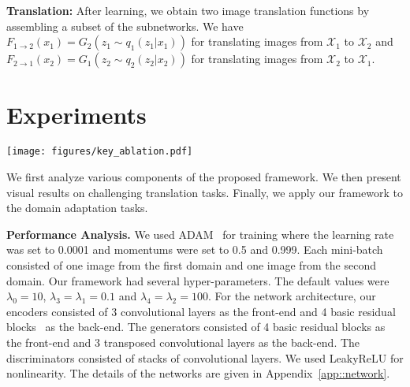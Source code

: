 \documentclass{article}
\begin{document}
{\bf Translation:} After learning, we obtain two image translation functions by assembling a subset of the subnetworks. We have $F_{1\rightarrow 2} (x_1)=G_2 (z_1 \sim q_1 (z_1|x_1))$ for translating images from $\mathcal{X}_1$ to $\mathcal{X}_2$ and  $F_{2\rightarrow 1} (x_2)=G_1 (z_2 \sim q_2 (z_2|x_2))$ for translating images from $\mathcal{X}_2$ to $\mathcal{X}_1$.


 \section{Experiments}

\begin{figure*}[t]
\centering
\texttt{[image: figures/key\_ablation.pdf]}
\caption{\small (a) Illustration of the Map dataset. Left: satellite image. Right: map. We translate holdout satellite images to maps and measure the accuracy achieved by various configurations of the proposed framework. (b) Translation accuracy versus different network architectures. (c) Translation accuracy versus different hyper-parameter values. (d) Impact of weight-sharing and cycle-consistency constraints on translation accuracy.}
\label{fig::map}
\vspace{-4 mm}
\end{figure*}

We first analyze various components of the proposed framework. We then present visual results on challenging translation tasks. Finally, we apply our framework to the domain adaptation tasks.

{\bf Performance Analysis.} We used ADAM~\cite{kingma2014adam} for training where the learning rate was set to 0.0001 and momentums were set to 0.5 and 0.999. Each mini-batch consisted of one image from the first domain and one image from the second domain. Our framework had several hyper-parameters. The default values were $\lambda_0=10$, $\lambda_3=\lambda_1=0.1$ and $\lambda_4=\lambda_2=100$. For the network architecture, our encoders consisted of 3 convolutional layers as the front-end and 4 basic residual blocks~\cite{he2016deep} as the back-end. The generators consisted of 4 basic residual blocks as the front-end and 3 transposed convolutional layers as the back-end. The discriminators consisted of stacks of convolutional layers. We used LeakyReLU for nonlinearity. The details of the networks are given in Appendix~\ref{app::network}.
\end{document}
